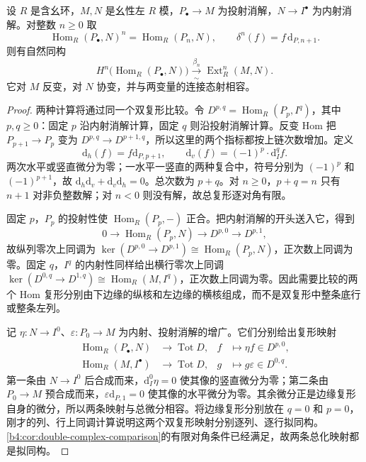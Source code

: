 \begin{theorem}\label{b4:thm:ext-balanced}
	设 \(R\) 是含幺环，\(M,N\) 是幺性左 \(R\) 模，\(P_\bullet\to M\) 为投射消解，\(N\to I^\bullet\) 为内射消解。对整数 \(n\ge0\) 取
	\[
		\operatorname{Hom}_R(P_\bullet,N)^n=\operatorname{Hom}_R(P_n,N), \qquad \delta^n(f)=f\,\mathrm{d}_{P,n+1}.
	\]
	则有自然同构
	\[
		H^n\bigl(\operatorname{Hom}_R(P_\bullet,N)\bigr) \xrightarrow[\sim]{\beta_n}\operatorname{Ext}_R^n(M,N).
	\]
	它对 \(M\) 反变，对 \(N\) 协变，并与两变量的连接态射相容。
\end{theorem}
\begin{proof}
	两种计算将通过同一个双复形比较。令 \(D^{p,q}=\operatorname{Hom}_R(P_p,I^q)\)，其中 \(p,q\ge0\)：固定 \(p\) 沿内射消解计算，固定 \(q\) 则沿投射消解计算。反变 Hom 把 \(P_{p+1}\to P_p\) 变为 \(D^{p,q}\to D^{p+1,q}\)，所以这里的两个指标都按上链次数增加。定义
	\[
		\mathrm{d}_h(f)=f\mathrm{d}_{P,p+1},\qquad \mathrm{d}_v(f)=(-1)^p\cdot\mathrm{d}_I^qf.
	\]
	两次水平或竖直微分为零；一水平一竖直的两种复合中，符号分别为 \((-1)^p\) 和 \((-1)^{p+1}\)，故 \(\mathrm{d}_h\mathrm{d}_v+\mathrm{d}_v\mathrm{d}_h=0\)。总次数为 \(p+q\)。对 \(n\ge0\)，\(p+q=n\) 只有 \(n+1\) 对非负整数解；对 \(n<0\) 则没有解，故总复形逐对角有限。

	固定 \(p\)，\(P_p\) 的投射性使 \(\operatorname{Hom}_R(P_p,-)\) 正合。把内射消解的开头送入它，得到
	\[
		0\longrightarrow\operatorname{Hom}_R(P_p,N) \longrightarrow D^{p,0}\longrightarrow D^{p,1},
	\]
	故纵列零次上同调为 \(\ker(D^{p,0}\to D^{p,1})\cong\operatorname{Hom}_R(P_p,N)\)，正次数上同调为零。固定 \(q\)，\(I^q\) 的内射性同样给出横行零次上同调 \(\ker(D^{0,q}\to D^{1,q})\cong\operatorname{Hom}_R(M,I^q)\)，正次数上同调为零。因此需要比较的两个 Hom 复形分别由下边缘的纵核和左边缘的横核组成，而不是双复形中整条底行或整条左列。

	记 \(\eta:N\to I^0\)、\(\varepsilon:P_0\to M\) 为内射、投射消解的增广。它们分别给出复形映射
	\[
		\begin{aligned}
			\operatorname{Hom}_R(P_\bullet,N)&\longrightarrow\operatorname{Tot}D, &f&\longmapsto\eta f\in D^{p,0},\\
			\operatorname{Hom}_R(M,I^\bullet)&\longrightarrow\operatorname{Tot}D, &g&\longmapsto g\varepsilon\in D^{0,q}.
		\end{aligned}
	\]
	第一条由 \(N\to I^0\) 后合成而来，\(\mathrm{d}_I^0\eta=0\) 使其像的竖直微分为零；第二条由 \(P_0\to M\) 预合成而来，\(\varepsilon\mathrm{d}_{P,1}=0\) 使其像的水平微分为零。其余微分正是边缘复形自身的微分，所以两条映射与总微分相容。将边缘复形分别放在 \(q=0\) 和 \(p=0\)，刚才的列、行上同调计算说明这两个双复形映射分别逐列、逐行拟同构。\cref{b4:cor:double-complex-comparison}的有限对角条件已经满足，故两条总化映射都是拟同构。


\end{proof}

